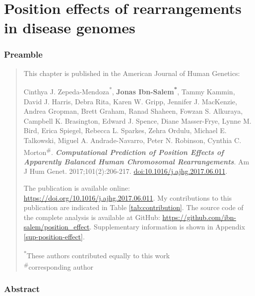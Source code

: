 \documentclass[a4paper,twoside=true,openright,parskip=full,chapterprefix=true,11pt,headings=normal,bibliography=totoc,listof=totoc,titlepage=on,captions=tableabove,draft=false]{scrreprt}
\theoremstyle{definition}
\theoremstyle{definition}
\theoremstyle{definition}
\theoremstyle{remark}
\begin{document}
\hypertarget{position-effect}{%
\chapter{Position effects of rearrangements in disease
genomes}\label{position-effect}}

\hypertarget{preamble-2}{%
\subsection*{Preamble}\label{preamble-2}}

\begin{quote}
This chapter is published in the American Journal of Human Genetics:

Cinthya J. Zepeda-Mendoza\textsuperscript{*}, \textbf{Jonas
Ibn-Salem\textsuperscript{*}}, Tammy Kammin, David J. Harris, Debra
Rita, Karen W. Gripp, Jennifer J. MacKenzie, Andrea Gropman, Brett
Graham, Ranad Shaheen, Fowzan S. Alkuraya, Campbell K. Brasington,
Edward J. Spence, Diane Masser-Frye, Lynne M. Bird, Erica Spiegel,
Rebecca L. Sparkes, Zehra Ordulu, Michael E. Talkowski, Miguel A.
Andrade-Navarro, Peter N. Robinson, Cynthia C.
Morton\textsuperscript{\#}. \textbf{\emph{Computational Prediction of
Position Effects of Apparently Balanced Human Chromosomal
Rearrangements}}. Am J Hum Genet. 2017;101(2):206-217.
\href{https://doi.org/10.1016/j.ajhg.2017.06.011}{doi:10.1016/j.ajhg.2017.06.011}.

The publication is available online:
\url{https://doi.org/10.1016/j.ajhg.2017.06.011}. My contributions to
this publication are indicated in Table \ref{tab:contribution}. The
source code of the complete analysis is available at GitHub:
\url{https://github.com/ibn-salem/position_effect}. Supplementary
information is shown in Appendix \ref{sup-position-effect}.

\textsuperscript{*}These authors contributed equally to this work\\
\textsuperscript{\#}corresponding author
\end{quote}

\hypertarget{abstract-3}{%
\subsection*{Abstract}\label{abstract-3}}
\end{document}
